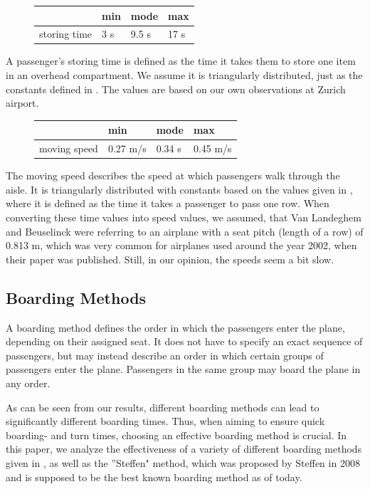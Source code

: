 \documentclass[11pt]{article}
\begin{document}
\begin{figure}[h!]
	\center
\begin{tabular}{l|l l l}

	&min &mode&max \\
	\hline
storing time & 3 s &9.5 s & 17 s \\
	\hline

	\end{tabular}
\end{figure}
A passenger's storing time is defined as the time it takes them to store one item in an overhead compartment. We assume it is triangularly distributed, just as the constants defined in \cite{beus}. The values are based on our own observations at Zurich airport.

\begin{figure}[h!]
	\center
\begin{tabular}{l|l l l}

	&min &mode&max \\
	\hline
moving speed &0.27 m/s&0.34 s& 0.45 m/s   \\
	\hline
\end{tabular}
\end{figure}
The moving speed describes the speed at which passengers walk through the aisle. It is triangularly distributed with constants based on the values given in \cite{beus}, where it is defined as the time it takes a passenger to pass one row. When converting these time values into speed values, we assumed, that Van Landeghem and Beuselinck were referring to an airplane with a seat pitch (length of a row) of 0.813 m, which was very common for airplanes used around the year 2002, when their paper was published. Still, in our opinion, the speeds seem a bit slow.


\subsection{Boarding Methods}
A boarding method defines the order in which the passengers enter the plane, depending on their assigned seat. It does not have to specify an exact sequence of passengers, but may instead describe an order in which certain groups of passengers enter the plane. Passengers in the same group may board the plane in any order. 


As can be seen from our results, different boarding methods can lead to significantly different boarding times. Thus, when aiming to ensure quick boarding- and turn times, choosing an effective boarding method is crucial. In this paper, we analyze the effectiveness of a variety of different boarding methods given in \cite{beus}, as well as the ''Steffen" method, which was proposed by Steffen \cite{steffen} in 2008 and is supposed to be the best known boarding method as of today.
\end{document}
